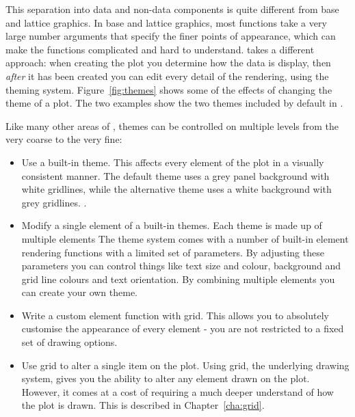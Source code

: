 This separation into data and non-data components is quite different from base and lattice graphics.  In base and lattice graphics, most functions take a very large number arguments that specify the finer points of appearance, which can make the functions complicated and hard to understand.  \ggplot takes a different approach: when creating the plot you determine how the data is display, then {\em after} it has been created you can edit every detail of the rendering, using the theming system.  \noindent Figure~\ref{fig:themes} shows some of the effects of changing the theme of a plot.  The two examples show the two themes included by default in \ggplot.

% 


Like many other areas of \ggplot, themes can be controlled on multiple levels from the very coarse to the very fine:

\begin{itemize}
  \item Use a built-in theme.  This affects every element of the plot in a visually consistent manner.  The default theme uses a grey panel background with white gridlines, while the alternative theme uses a white background with grey gridlines.  .

  \item Modify a single element of a built-in themes. Each theme is made up of multiple elements The theme system comes with a number of built-in element rendering functions with a limited set of parameters.  By adjusting these parameters you can control things like text size and colour, background and grid line colours and text orientation.  By combining multiple elements you can create your own theme.
  
  \item Write a custom element function with grid.  This allows you to absolutely customise the appearance of every element - you are not restricted to a fixed set of drawing options.  

  \item Use grid to alter a single item on the plot.  Using grid, the underlying drawing system, gives you the ability to alter any element drawn on the plot.  However, it comes at a cost of requiring a much deeper understand of how the plot is drawn.  This is described in Chapter~\ref{cha:grid}.
  
\end{itemize}

